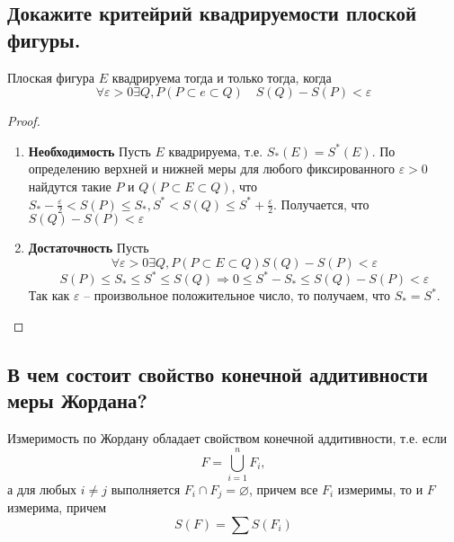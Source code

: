 \subsection{Докажите критейрий квадрируемости плоской фигуры.}
\begin{theorem}
    Плоская фигура $E$ квадрируема тогда и только тогда, когда
    \[
        \forall \varepsilon > 0
        \exists Q, P (P \subset e \subset Q)
        \quad
        S(Q) - S(P) < \varepsilon
    \]
    \begin{proof}
        \text{} \newline
        \begin{enumerate}
            \item \textbf{Необходимость} \newline
            Пусть $E$ квадрируема, т.е. $S_*(E) = S^*(E)$. По определению верхней и нижней меры для любого фиксированного $\varepsilon > 0$ найдутся такие $P$ и $Q (P \subset E \subset Q)$, что $S_* - \frac{\varepsilon}{2} < S(P) \leqslant S_*, S^* < S(Q) \leqslant S^* + \frac{\varepsilon}{2}$.
            Получается, что $S(Q) - S(P) < \varepsilon$
            \item \textbf{Достаточность} \newline
            Пусть 
            \[
                \forall \varepsilon > 0
                \exists Q, P (P \subset E \subset Q)
                S(Q) - S(P) < \varepsilon
            \]
            \[
                S(P) \leqslant S_* \leqslant S^* \leqslant S(Q)
                \Rightarrow
                0 \leqslant S^* - S_* \leqslant S(Q) - S(P) < \varepsilon
            \]
            Так как $\varepsilon$ -- произвольное положительное число, то получаем, что $S_* = S^*$.
        \end{enumerate}
    \end{proof}
\end{theorem}

\subsection{В чем состоит свойство конечной аддитивности меры Жордана?}
\begin{definition}
    Измеримость по Жордану обладает свойством конечной аддитивности, т.е. если
    \[
        F = \bigcup_{i=1}^n F_i,
    \]
    а для любых $i \neq j$ выполняется $F_i \cap F_j = \varnothing$, причем все $F_i$ измеримы, то и $F$ измерима, причем
    \[
        S(F) = \sum S(F_i)
    \]
\end{definition}